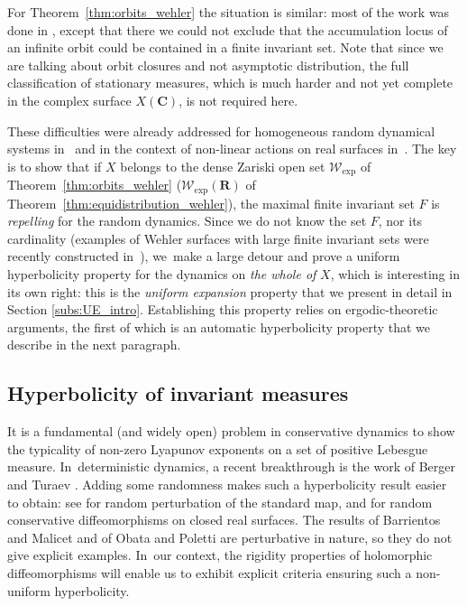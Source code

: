 \documentclass[JEP,XML,SOM,Unicode,published]{cedram}
\def\C{\mathbf{C}}
\def\R{\mathbf{R}}
\newcommand{\cW}{\mathcal{W}}
\theoremstyle{plain}
\theoremstyle{definition}
\begin{document}
For Theorem~\ref{thm:orbits_wehler} the situation is similar:
most of the work was done in \cite[\S 8]{invariant}, except that there we could not exclude
that the accumulation locus of an infinite orbit could be contained in a finite invariant set.
Note that since we are talking about orbit closures and not asymptotic distribution,
the full classification of stationary measures,
which is much harder and not yet complete in the
complex surface $X(\C)$, is not required here.

These difficulties were already addressed for homogeneous random dynamical systems in~\cite{benoist-quint3, Eskin-Lindenstrauss:RandomWalk} and in the context of non-linear actions on real
surfaces in~\cite{liu_thesis, chung}.
The key is to show that if $X$ belongs to the
dense Zariski open set $ \cW_{\mathrm{exp}}$ of Theorem~\ref{thm:orbits_wehler}
(\resp $ \cW_{\mathrm{exp}}(\R)$ of Theorem~\ref{thm:equidistribution_wehler}), the maximal finite invariant set
$F$ is \emph{repelling} for the random dynamics. Since we do not know the set $F$, nor its cardinality (examples of Wehler surfaces with large finite invariant sets were recently constructed
in~\cite{fuchs-litman-silverman-tran}), we~make a large detour and prove a uniform
hyperbolicity property for
the dynamics on \emph{the whole of} $X$, which is interesting in its own right: this is the \emph{uniform expansion} property that we present in detail in Section \ref{subs:UE_intro}.
Establishing this property relies on ergodic-theoretic arguments, the first of which is an
automatic hyperbolicity property that we describe in the next paragraph.

\subsection{Hyperbolicity of invariant measures} \label{subs:hyperbolicity}

It is a fundamental (and widely open) problem in conservative dynamics to show the typicality of non-zero Lyapunov exponents
on a set of positive Lebesgue measure. In~deterministic dynamics, a recent breakthrough is the work of
Berger and Turaev \cite{berger-turaev}. Adding some randomness makes such a hyperbolicity result easier to obtain:
see \cite{blumenthal-xue-young} for random perturbation of the standard map, and
\cite{barrientos-malicet, obata-poletti}
for random conservative diffeomorphisms on closed real surfaces. The results of Barrientos and Malicet \cite{barrientos-malicet} and of
Obata and Poletti \cite{obata-poletti} are perturbative in nature, so they do not give explicit examples. In~our context, the rigidity properties of holomorphic diffeomorphisms will
enable us to exhibit explicit criteria ensuring such a non-uniform hyperbolicity.
\end{document}
